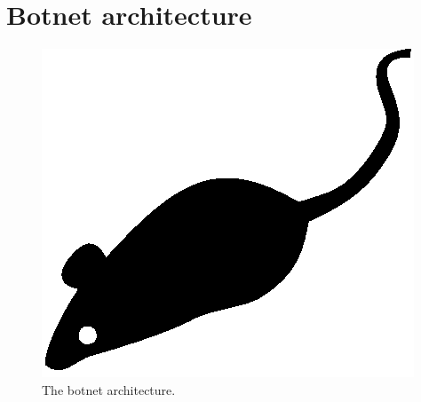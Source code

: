 \section{Botnet architecture}
\label{sec:botnet-architecture}

\lipsum[1]

\begin{figure}[tp]
	\centering
	\includegraphics{./fig/acmlarge-mouse}
	\caption{The botnet architecture.}
		\label{fig:botnet-architecture}
\end{figure}

\lipsum[1]
